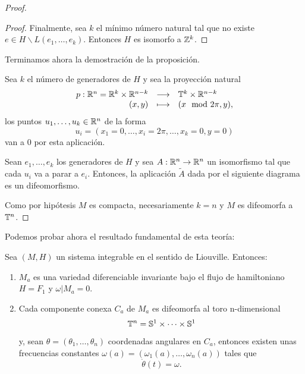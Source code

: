 \begin{proof}
\begin{proof}
	Finalmente, sea $k$ el mínimo número natural tal que no existe $e \in H \backslash L(e_1,\dots,e_k)$. Entonces $H$ es isomorfo a $\mathbb{Z}^k$.
\end{proof}

Terminamos ahora la demostración de la proposición.
 
  Sea $k$ el número de generadores de $H$ y sea la proyección natural
  \[
    \begin{array}{rcl}
      p: \mathbb{R}^n = \mathbb{R}^k \times \mathbb{R}^{n-k} & \longrightarrow & \mathbb{T}^k \times \mathbb{R}^{n-k} \\
      (x,y) & \longmapsto & (x\mod  2\pi, y),
    \end{array}
  \]
  los puntos $u_1,\dots,u_k \in \mathbb{R}^n$ de la forma 
  \[
    u_i = (x_1=0,\dots,x_i=2\pi,\dots,x_k=0,y=0)
  \]
  van a 0 por esta aplicación.

  Sean $e_1,\dots,e_k$ los generadores de $H$ y sea $A:\mathbb{R}^n \rightarrow \mathbb{R}^n$ un isomorfismo tal que cada $u_i$ va a parar a $e_i$. Entonces, la aplicación $\tilde{A}$ dada por el siguiente diagrama es un difeomorfismo.
  
\begin{center}
\end{center}

Como por hipótesis $M$ es compacta, necesariamente $k=n$ y $M$ es difeomorfa a $\mathbb{T}^n$.
\end{proof}

Podemos probar ahora el resultado fundamental de esta teoría:
\begin{thm}[Arnold]
Sea $(M,H)$ un sistema integrable en el sentido de Liouville. Entonces:
\begin{enumerate}
  \item $M_a$ es una variedad diferenciable invariante bajo el flujo de hamiltoniano $H=F_1$ y $\omega|M_a=0$.
  \item Cada componente conexa $C_a$ de $M_a$ es difeomorfa al toro n-dimensional 
    \[
      \mathbb{T}^n=\mathbb{S}^1 \times \cdots \times \mathbb{S}^1
    \]
    y, sean $\theta=(\theta_1,\dots,\theta_n)$ coordenadas angulares en $C_a$, entonces existen unas frecuencias constantes $\omega(a)=(\omega_1(a),\dots,\omega_n(a))$ tales que
    \[
    \dot{\theta}(t)=\omega.
    \]
    
\end{enumerate}

\end{thm}

